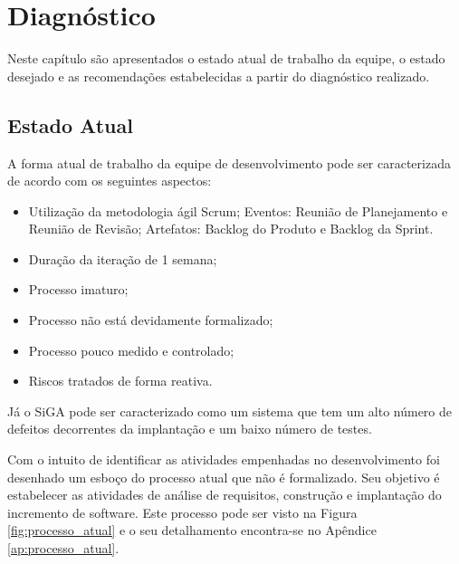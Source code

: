 \chapter{Diagnóstico} \label{cap:diagnostico}

Neste capítulo são apresentados o estado atual de trabalho da equipe, o estado desejado e as recomendações estabelecidas
a partir do diagnóstico realizado.

\section{Estado Atual}

A forma atual de trabalho da equipe de desenvolvimento pode ser caracterizada de acordo com os seguintes aspectos:

\begin{itemize}
  \item Utilização da metodologia ágil Scrum;
    \subitem Eventos: Reunião de Planejamento e Reunião de Revisão;
    \subitem Artefatos: Backlog do Produto e Backlog da Sprint.
  \item Duração da iteração de 1 semana;
  \item Processo imaturo;
  \item Processo não está devidamente formalizado;
  \item Processo pouco medido e controlado;
  \item Riscos tratados de forma reativa.
\end{itemize}

Já o SiGA pode ser caracterizado como um sistema que tem um alto número de defeitos decorrentes da implantação e um baixo número de testes.

Com o intuito de identificar as atividades empenhadas no desenvolvimento foi desenhado um esboço do processo atual 
que não é formalizado. Seu objetivo é estabelecer
as atividades de análise de requisitos, construção e implantação do incremento de software. Este processo pode ser visto na 
Figura \ref{fig:processo_atual} e o seu detalhamento encontra-se no Apêndice \ref{ap:processo_atual}.

